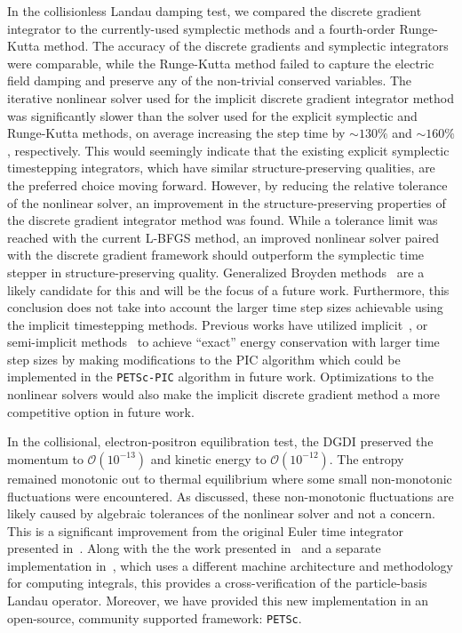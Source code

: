 \documentclass[preprint,12pt]{elsarticle}
\theoremstyle{definition}
\begin{document}
In the collisionless Landau damping test, we compared the discrete gradient integrator to the currently-used symplectic methods and a fourth-order Runge-Kutta method. The accuracy of the discrete gradients and symplectic integrators were comparable, while the Runge-Kutta method failed to capture the electric field damping and preserve any of the non-trivial conserved variables. The iterative nonlinear solver used for the implicit discrete gradient integrator method was significantly slower than the solver used for the explicit symplectic and Runge-Kutta methods, on average increasing the step time by $\sim 130\%$ and  $\sim 160\%$, respectively. This would seemingly indicate that the existing explicit symplectic timestepping integrators, which have similar structure-preserving qualities, are the preferred choice moving forward. However, by reducing the relative tolerance of the nonlinear solver, an improvement in the structure-preserving properties of the discrete gradient integrator method was found. While a tolerance limit was reached with the current L-BFGS method, an improved nonlinear solver paired with the discrete gradient framework should outperform the symplectic time stepper in structure-preserving quality. Generalized Broyden methods~\cite{Gerber1981} are a likely candidate for this and will be the focus of a future work. Furthermore, this conclusion does not take into account the larger time step sizes achievable using the implicit timestepping methods. Previous works have utilized implicit~\cite{Markidis2011}, or semi-implicit methods~\cite{Lapenta2017} to achieve ``exact'' energy conservation with larger time step sizes by making modifications to the PIC algorithm which could be implemented in the \texttt{PETSc-PIC} algorithm in future work. Optimizations to the nonlinear solvers would also make the implicit discrete gradient method a more competitive option in future work.

In the collisional, electron-positron equilibration test, the DGDI preserved the momentum to $\mathcal{O}(10^{-13})$ and kinetic energy to $\mathcal{O}(10^{-12})$. The entropy remained monotonic out to thermal equilibrium where some small non-monotonic fluctuations were encountered. As discussed, these non-monotonic fluctuations are likely caused by algebraic tolerances of the nonlinear solver and not a concern. This is a significant improvement from the original Euler time integrator presented in~\cite{Carrillo2020}. Along with the the work presented in~\cite{pusztay2023landaucollisionintegralparticle} and a separate implementation in~\cite{Zonta2022}, which uses a different machine architecture and methodology for computing integrals, this provides a cross-verification of the particle-basis Landau operator. Moreover, we have provided this new implementation in an open-source, community supported framework: \texttt{PETSc}. 
\end{document}
